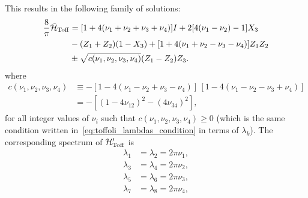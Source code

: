 This results in the following family of solutions:
\begin{equation}
\begin{aligned}
	\frac{8}{\pi}\tilde{{\mathcal{H}}}_{\operatorname{Toff}} &=
	[1 + 4(\nu_1+\nu_2+\nu_3+\nu_4)] I +
	2[4(\nu_1-\nu_2) - 1] X_3 \\
	&- (Z_1 + Z_2)(1 - X_3) +
	[1 + 4(\nu_1+\nu_2-\nu_3-\nu_4)] Z_1 Z_2 \\
	&\pm \sqrt{c(\nu_1,\nu_2,\nu_3,\nu_4)} (Z_1 - Z_2)Z_3.
\end{aligned}
\label{eq:toff_tilde_general_solution}
\end{equation}
where
\begin{equation}
\begin{split}
	c(\nu_1, \nu_2, \nu_3, \nu_4) &\equiv
		-[1 - 4(\nu_1 - \nu_2 + \nu_3 - \nu_4)]
		\, [1 - 4(\nu_1 - \nu_2 - \nu_3 + \nu_4)]\\
		&= -[(1-4\nu_{12})^2-(4\nu_{34})^2],
\end{split}
\end{equation}
for all integer values of $\nu_i$ such that $c(\nu_1, \nu_2, \nu_3, \nu_4) \ge 0$ (which is the same condition written in~\cref{eq:toffoli_lambdas_condition} in terms of $\lambda_k$).
The corresponding spectrum of ${\mathcal{H}}'_{\operatorname{Toff}}$ is
\begin{equation}
\begin{aligned}
	\lambda_1 &= \lambda_2 = 2\pi \nu_1, \\
	\lambda_3 &= \lambda_4 = 2\pi \nu_2, \\
	\lambda_5 &= \lambda_6 = 2\pi \nu_3, \\
	\lambda_7 &= \lambda_8 = 2\pi \nu_4, 
\end{aligned}
\end{equation}
